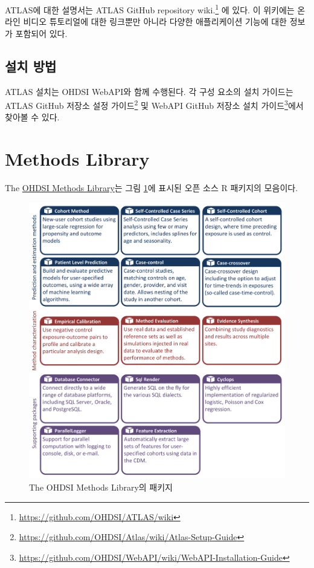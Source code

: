 \documentclass[10.5pt]{book}
\let\rmarkdownfootnote\footnote%
\def\footnote{\protect\rmarkdownfootnote}
\theoremstyle{definition}
\theoremstyle{definition}
\theoremstyle{definition}
\theoremstyle{remark}
\begin{document}
ATLAS에 대한 설명서는 ATLAS GitHub repository wiki.\footnote{\url{https://github.com/OHDSI/ATLAS/wiki}}
에 있다. 이 위키에는 온라인 비디오 튜토리얼에 대한 링크뿐만 아니라
다양한 애플리케이션 기능에 대한 정보가 포함되어 있다.

\subsection{설치 방법}\label{-}

ATLAS 설치는 OHDSI WebAPI와 함께 수행된다. 각 구성 요소의 설치 가이드는
ATLAS GitHub 저장소 설정 가이드\footnote{\url{https://github.com/OHDSI/Atlas/wiki/Atlas-Setup-Guide}}
및 WebAPI GitHub 저장소 설치 가이드\footnote{\url{https://github.com/OHDSI/WebAPI/wiki/WebAPI-Installation-Guide}}에서
찾아볼 수 있다. 

\section{Methods Library}\label{methods-library}

The \href{https://ohdsi.github.io/MethodsLibrary/}{OHDSI Methods
Library}는 그림 \ref{fig:methodsLibrary}에 표시된 오픈 소스 R 패키지의
모음이다. 

\begin{figure}

{\centering \includegraphics[width=1\linewidth]{images/OhdsiAnalyticsTools/methodsLibrary} 

}

\caption{The OHDSI Methods Library의 패키지}\label{fig:methodsLibrary}
\end{figure}
\end{document}
